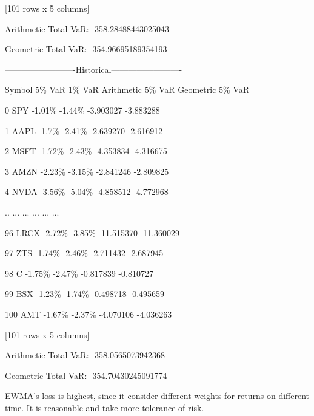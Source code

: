 \documentclass{article}
\begin{document}
[101 rows x 5 columns]\par
Arithmetic Total VaR: -358.28488443025043\par
Geometric Total VaR: -354.96695189354193\par

-------------------------Historical-------------------------\par
    Symbol  5\% VaR  1\% VaR  Arithmetic 5\% VaR  Geometric 5\% VaR\par
0      SPY  -1.01\%  -1.44\%          -3.903027         -3.883288\par
1     AAPL   -1.7\%  -2.41\%          -2.639270         -2.616912\par
2     MSFT  -1.72\%  -2.43\%          -4.353834         -4.316675\par
3     AMZN  -2.23\%  -3.15\%          -2.841246         -2.809825\par
4     NVDA  -3.56\%  -5.04\%          -4.858512         -4.772968\par
..     ...     ...     ...                ...               ...\par
96    LRCX  -2.72\%  -3.85\%         -11.515370        -11.360029\par
97     ZTS  -1.74\%  -2.46\%          -2.711432         -2.687945\par
98       C  -1.75\%  -2.47\%          -0.817839         -0.810727\par
99     BSX  -1.23\%  -1.74\%          -0.498718         -0.495659\par
100    AMT  -1.67\%  -2.37\%          -4.070106         -4.036263\par

[101 rows x 5 columns]\par
Arithmetic Total VaR: -358.0565073942368\par
Geometric Total VaR: -354.70430245091774\par

EWMA's loss is highest, since it consider different weights for returns on different time. It is reasonable and take more tolerance of risk.
\end{document}
